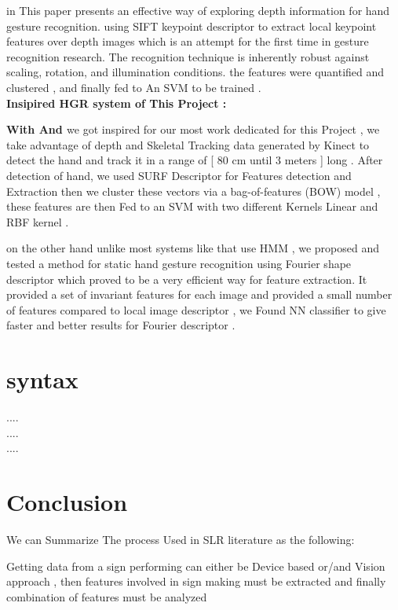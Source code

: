 in \cite{dardas} This paper presents an effective way of exploring depth information for hand gesture recognition. using  SIFT keypoint descriptor to extract local keypoint features over depth images which is an attempt for the first time in gesture recognition research. The recognition technique is inherently robust against scaling, rotation, and illumination conditions.  the features were  quantified  and clustered , and finally fed to  An SVM to be trained .\\


\textbf{ Insipired HGR system  of This Project : }


\textbf{With \cite{dardas} And \cite{47} } we got inspired for our most work dedicated for this Project , we take advantage of  depth and Skeletal Tracking  data generated by Kinect to detect the hand and track it  in a range of [ 80 cm until 3 meters ] long  .
After detection of hand, we used SURF Descriptor for Features detection and Extraction then we  cluster these vectors via a bag-of-features (BOW) model , these features are then Fed to an SVM with two different Kernels Linear and RBF kernel .

on the other hand unlike most systems like \cite{33} that use HMM ,  we proposed and tested a method for static hand gesture recognition using  Fourier shape  descriptor which proved to be a very efficient way for feature extraction. It provided a set of invariant features for each image and provided a small number of features compared to local image descriptor  , we Found NN classifier to give faster and better results for Fourier descriptor .


\section{syntax}

....
\\
....
\\
....


\newpage
\section{Conclusion}

We can Summarize The process Used in SLR literature as the following:

Getting data from a sign performing can either be Device based or/and Vision approach , then features
involved in sign making must be extracted and finally combination of features must be analyzed 


